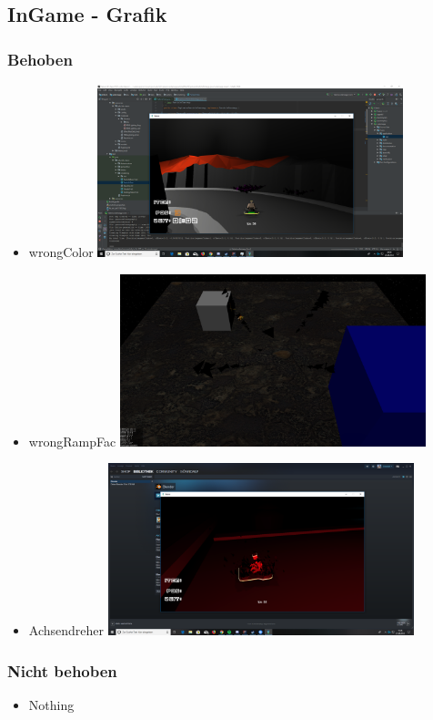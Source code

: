 \subsection{InGame - Grafik}
\subsubsection{Behoben}

\begin{itemize}
    \item wrongColor
    \includegraphics[width=0.7\textwidth]{Grafik/pictures/wrongColor.png} %
    \item wrongRampFac
    \includegraphics[width=0.7\textwidth]{Grafik/pictures/rampFac.png} %
    \item Achsendreher
    \includegraphics[width=0.7\textwidth]{Grafik/pictures/Achsendreher.png} %
\end{itemize}

\subsubsection{Nicht behoben}
\begin{itemize}
    \item Nothing
    
\end{itemize}